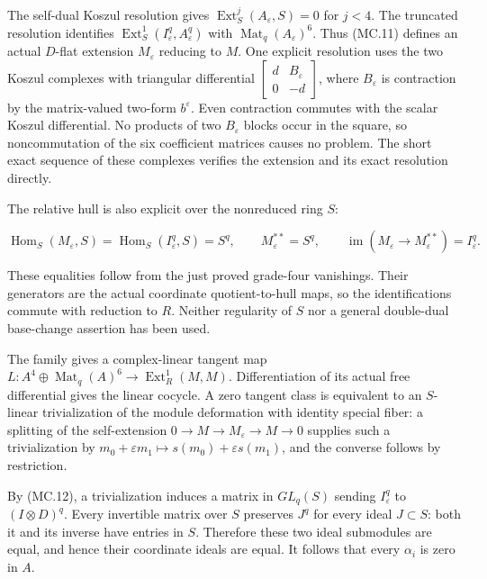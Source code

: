 The self-dual Koszul resolution gives
\(\operatorname{Ext}^j_S(A_\varepsilon,S)=0\) for \(j<4\).
The truncated resolution identifies
\(\operatorname{Ext}^1_S(I_\varepsilon^q,A_\varepsilon^q)\) with
\(\operatorname{Mat}_q(A_\varepsilon)^6\). Thus (MC.11) defines an
actual \(D\)-flat extension \(M_\varepsilon\) reducing to \(M\).
One explicit resolution uses the two Koszul complexes with triangular
differential \(\left[\begin{smallmatrix}d&B_\varepsilon\\0&-d\end{smallmatrix}\right]\),
where \(B_\varepsilon\) is contraction by the matrix-valued two-form
\(b^\varepsilon\). Even contraction commutes with the scalar Koszul
differential. No products of two \(B_\varepsilon\) blocks occur in
the square, so noncommutation of the six coefficient matrices causes
no problem. The short exact sequence of these complexes verifies the
extension and its exact resolution directly.

The relative hull is also explicit over the nonreduced ring \(S\):

\[
 \operatorname{Hom}_S(M_\varepsilon,S)
       =\operatorname{Hom}_S(I_\varepsilon^q,S)=S^q,
 \qquad M_\varepsilon^{**}=S^q,
 \qquad
 \operatorname{im}(M_\varepsilon\to M_\varepsilon^{**})
       =I_\varepsilon^q.
 \tag{MC.12}
\]

These equalities follow from the just proved grade-four vanishings.
Their generators are the actual coordinate quotient-to-hull maps,
so the identifications commute with reduction to \(R\). Neither
regularity of \(S\) nor a general double-dual base-change assertion
has been used.

The family gives a complex-linear tangent map
\(L:A^4\oplus\operatorname{Mat}_q(A)^6\to
\operatorname{Ext}^1_R(M,M)\). Differentiation of its actual free
differential gives the linear cocycle. A zero tangent class is
equivalent to an \(S\)-linear trivialization of the module deformation
with identity special fiber: a splitting of the self-extension
\(0\to M\to M_\varepsilon\to M\to0\) supplies such a trivialization
by \(m_0+\varepsilon m_1\mapsto s(m_0)+\varepsilon s(m_1)\), and the
converse follows by restriction.

By (MC.12), a trivialization induces a matrix in \(GL_q(S)\) sending
\(I_\varepsilon^q\) to \((I\otimes D)^q\). Every invertible matrix
over \(S\) preserves \(J^q\) for every ideal \(J\subset S\): both
it and its inverse have entries in \(S\). Therefore these two ideal
submodules are equal, and hence their coordinate ideals are equal.
It follows that every \(\alpha_i\) is zero in \(A\).

